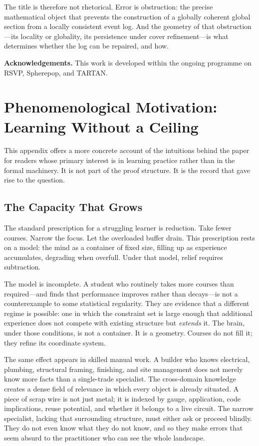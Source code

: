 \documentclass[12pt,oneside]{article}
\theoremstyle{plain}
\theoremstyle{definition}
\theoremstyle{remark}
\begin{document}
The title is therefore not rhetorical. Error is obstruction: the precise
mathematical object that prevents the construction of a globally coherent global
section from a locally consistent event log. And the geometry of that
obstruction---its locality or globality, its persistence under cover
refinement---is what determines whether the log can be repaired, and how.

\bigskip
\noindent\textbf{Acknowledgements.} This work is developed within the ongoing
programme on RSVP, Spherepop, and TARTAN.

\newpage
\appendix
\section{Phenomenological Motivation: Learning Without a Ceiling}
\label{app:phenom}

This appendix offers a more concrete account of the intuitions behind the paper
for readers whose primary interest is in learning practice rather than in the
formal machinery. It is not part of the proof structure. It is the record that
gave rise to the question.

\subsection*{The Capacity That Grows}

The standard prescription for a struggling learner is reduction. Take fewer
courses. Narrow the focus. Let the overloaded buffer drain. This prescription
rests on a model: the mind as a container of fixed size, filling up as experience
accumulates, degrading when overfull. Under that model, relief requires
subtraction.

The model is incomplete. A student who routinely takes more courses than
required---and finds that performance improves rather than decays---is not a
counterexample to some statistical regularity. They are evidence that a different
regime is possible: one in which the constraint set is large enough that
additional experience does not compete with existing structure but
\emph{extends} it. The brain, under those conditions, is not a container. It is
a geometry. Courses do not fill it; they refine its coordinate system.

The same effect appears in skilled manual work. A builder who knows electrical,
plumbing, structural framing, finishing, and site management does not merely know
more facts than a single-trade specialist. The cross-domain knowledge creates a
dense field of relevance in which every object is already situated. A piece of
scrap wire is not just metal; it is indexed by gauge, application, code
implications, reuse potential, and whether it belongs to a live circuit. The
narrow specialist, lacking that surrounding structure, must either ask or
proceed blindly. They do not even know what they do not know, and so they make
errors that seem absurd to the practitioner who can see the whole landscape.
\end{document}
